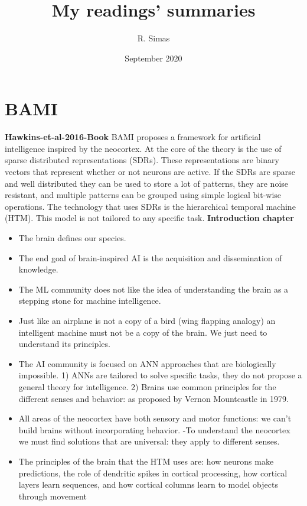 \documentclass{article}
\title{My readings' summaries}
\author{R. Simas }
\date{September 2020}
\begin{document}
\maketitle

\section{BAMI}
\textbf{Hawkins-et-al-2016-Book} \cite{Hawkins-et-al-2016-Book}\newline
BAMI proposes a framework for artificial intelligence inspired by the neocortex. At the core of the theory is the use of sparse distributed representations (SDRs). These representations are binary vectors that represent whether or not neurons are active. If the SDRs are sparse and well distributed they can be used to store a lot of patterns, they are noise resistant, and multiple patterns can be grouped using simple logical bit-wise operations. The technology that uses SDRs is the hierarchical temporal machine (HTM). This model is not tailored to any specific task.\newline
\textbf{Introduction chapter}
\begin{itemize}
\item The brain defines our species.
\item The end goal of brain-inspired AI is the acquisition and dissemination of knowledge.
\item The ML community does not like the idea of understanding the brain as a stepping stone for machine intelligence.
\item Just like an airplane is not a copy of a bird (wing flapping analogy) an intelligent machine must not be a copy of the brain. We just need to understand its principles.
\item The AI community is focused on ANN approaches that are biologically impossible.
1) ANNs are tailored to solve specific tasks, they do not propose a general theory for intelligence.
2) Brains use common principles for the different senses and behavior: as proposed by Vernon Mountcastle in 1979.
\item All areas of the neocortex have both sensory and motor functions: we can't build brains without incorporating behavior.
-To understand the neocortex we must find solutions that are universal: they apply to different senses. 
\item The principles of the brain that the HTM uses are: how neurons make predictions, the role of dendritic spikes in cortical processing, how cortical layers learn sequences, and how cortical columns learn to model objects through movement
\end{itemize}
\end{document}
